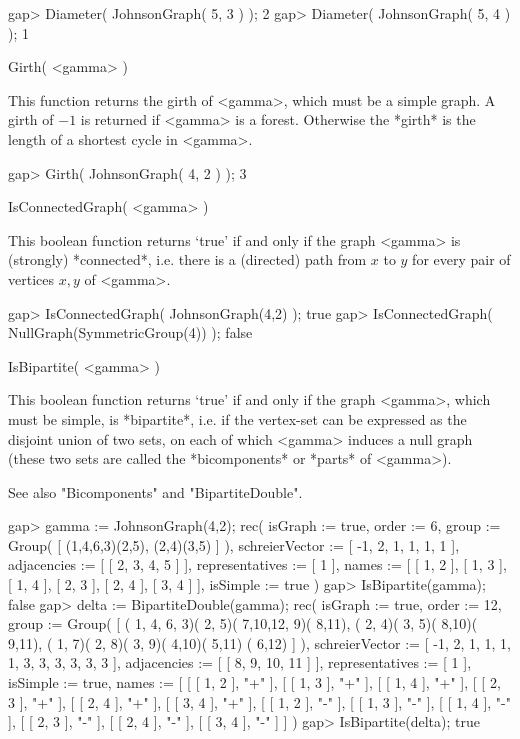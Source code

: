 \beginexample
gap> Diameter( JohnsonGraph( 5, 3 ) );
2
gap> Diameter( JohnsonGraph( 5, 4 ) );
1 
\endexample


\>Girth( <gamma> )

This function returns the girth of <gamma>, which must be a simple graph.
A girth of $-1$ is returned if <gamma> is a forest.  Otherwise the *girth*
is the length of a shortest cycle in <gamma>.

\beginexample
gap> Girth( JohnsonGraph( 4, 2 ) );
3 
\endexample


\>IsConnectedGraph( <gamma> )

This boolean function returns `true' if and only if the graph <gamma>
is (strongly) *connected*, i.e. there is a (directed) path from $x$ to
$y$ for every pair of vertices $x,y$ of <gamma>.

\beginexample
gap> IsConnectedGraph( JohnsonGraph(4,2) );
true
gap> IsConnectedGraph( NullGraph(SymmetricGroup(4)) );
false 
\endexample


\>IsBipartite( <gamma> )

This boolean function returns `true' if and only if the graph <gamma>,
which must be simple, is *bipartite*, i.e. if the vertex-set can be
expressed as the disjoint union of two sets, on each of which <gamma>
induces a null graph (these two sets are called the *bicomponents* or
*parts* of <gamma>).

See also "Bicomponents" and "BipartiteDouble".

\beginexample
gap> gamma := JohnsonGraph(4,2);
rec(
  isGraph := true,
  order := 6,
  group := Group( [ (1,4,6,3)(2,5), (2,4)(3,5) ] ),
  schreierVector := [ -1, 2, 1, 1, 1, 1 ],
  adjacencies := [ [ 2, 3, 4, 5 ] ],
  representatives := [ 1 ],
  names := [ [ 1, 2 ], [ 1, 3 ], [ 1, 4 ], [ 2, 3 ], [ 2, 4 ], [ 3, 4 ] ],
  isSimple := true )
gap> IsBipartite(gamma);
false
gap> delta := BipartiteDouble(gamma);
rec(
  isGraph := true,
  order := 12,
  group := Group( [ ( 1, 4, 6, 3)( 2, 5)( 7,10,12, 9)( 8,11), 
      ( 2, 4)( 3, 5)( 8,10)( 9,11), ( 1, 7)( 2, 8)( 3, 9)( 4,10)( 5,11)
        ( 6,12) ] ),
  schreierVector := [ -1, 2, 1, 1, 1, 1, 3, 3, 3, 3, 3, 3 ],
  adjacencies := [ [ 8, 9, 10, 11 ] ],
  representatives := [ 1 ],
  isSimple := true,
  names := [ [ [ 1, 2 ], "+" ], [ [ 1, 3 ], "+" ], [ [ 1, 4 ], "+" ], 
      [ [ 2, 3 ], "+" ], [ [ 2, 4 ], "+" ], [ [ 3, 4 ], "+" ], 
      [ [ 1, 2 ], "-" ], [ [ 1, 3 ], "-" ], [ [ 1, 4 ], "-" ], 
      [ [ 2, 3 ], "-" ], [ [ 2, 4 ], "-" ], [ [ 3, 4 ], "-" ] ] )
gap> IsBipartite(delta);
true
\endexample

